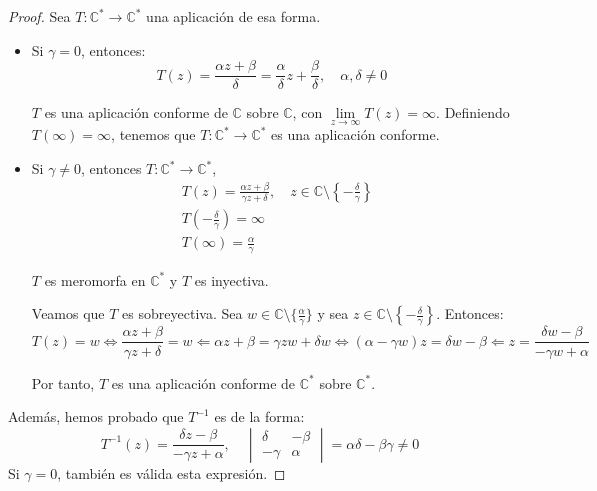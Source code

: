 \begin{proof}
    Sea $T: \mathbb{C}^\ast \to \mathbb{C}^\ast$ una aplicación de esa forma.
    \begin{itemize}
        \item Si $\gamma = 0$, entonces:
              $$T(z) = \frac{\alpha z + \beta}{\delta} = \frac{\alpha}{\delta}z + \frac{\beta}{\delta}, \quad \alpha, \delta \neq 0$$

              $T$ es una aplicación conforme de $\mathbb{C}$ sobre $\mathbb{C}$, con $\lim\limits_{z \to \infty} T(z) = \infty$.
              Definiendo $T(\infty) = \infty$, tenemos que $T: \mathbb{C}^\ast \to \mathbb{C}^\ast$ es una aplicación conforme.

        \item Si $\gamma \neq 0$, entonces $T: \mathbb{C}^\ast \to \mathbb{C}^\ast$,
              \begin{align*}
                   & T(z) = \frac{\alpha z + \beta}{\gamma z + \delta}, \quad z \in \mathbb{C} \setminus \left\{-\frac{\delta}{\gamma}\right\} \\
                   & T\left(-\frac{\delta}{\gamma}\right) = \infty                                                                             \\
                   & T(\infty) = \frac{\alpha}{\gamma}
              \end{align*}

              $T$ es meromorfa en $\mathbb{C}^\ast$ y $T$ es inyectiva.

              Veamos que $T$ es sobreyectiva.
              Sea $w \in \mathbb{C} \setminus \{\frac{\alpha}{\gamma}\}$ y sea $z \in \mathbb{C} \setminus \left\{-\frac{\delta}{\gamma}\right\}$.
              Entonces:
              $$T(z) = w \Leftrightarrow \frac{\alpha z + \beta}{\gamma z + \delta} = w \Leftarrow \alpha z + \beta = \gamma zw + \delta w \Leftrightarrow (\alpha - \gamma w)z = \delta w - \beta \Leftarrow z = \frac{\delta w - \beta}{-\gamma w + \alpha}$$

              Por tanto, $T$ es una aplicación conforme de $\mathbb{C}^\ast$ sobre $\mathbb{C}^\ast$.
    \end{itemize}

    Además, hemos probado que $T^{-1}$ es de la forma:
    $$T^{-1}(z) = \frac{\delta z - \beta}{-\gamma z + \alpha}, \quad \begin{vmatrix}
            \delta  & -\beta \\
            -\gamma & \alpha
        \end{vmatrix} = \alpha\delta - \beta\gamma \neq 0$$
    Si $\gamma = 0$, también es válida esta expresión.
\end{proof}

